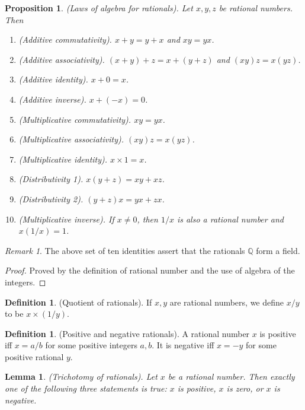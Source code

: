\documentclass[12pt]{article}
\newtheorem{lemma}[theorem]{Lemma}
\newtheorem{proposition}[theorem]{Proposition}
\theoremstyle{definition}
\newtheorem{definition}[theorem]{Definition}
\theoremstyle{remark}
\newtheorem*{remark}{Remark}
\begin{document}
\begin{proposition}
    (Laws of algebra for rationals). Let $x, y, z$ be rational numbers. Then
    \begin{enumerate}
        \item (Additive commutativity). $x + y = y + x$ and $xy = yx$.
        \item (Additive associativity). $(x + y) + z = x + (y + z)$ and $(xy)z = x(yz)$.
        \item (Additive identity). $x + 0 = x$.
        \item (Additive inverse). $x + (-x) = 0$.
        \item (Multiplicative commutativity). $xy = yx$.
        \item (Multiplicative associativity). $(xy)z = x(yz)$.
        \item (Multiplicative identity). $x \times 1 = x$.
        \item (Distributivity 1). $x(y + z) = xy + xz$.
        \item (Distributivity 2). $(y + z)x = yx + zx$.
        \item (Multiplicative inverse). If $x \neq 0$, then $1/x$ is also a rational number and $x(1/x) = 1$.
    \end{enumerate}
\end{proposition}

\begin{remark}
    The above set of ten identities assert that the rationals $\mathbb{Q}$ form a field.
\end{remark}

\begin{proof}
    Proved by the definition of rational number and the use of algebra of the integers.
\end{proof}

\begin{definition}
    (Quotient of rationals). If $x, y$ are rational numbers, we define $x/y$ to be $x \times (1/y)$.
\end{definition}

\begin{definition}
    (Positive and negative rationals). A rational number $x$ is positive iff $x = a/b$ for some positive integers $a, b$. It is negative iff $x = -y$ for some positive rational $y$.
\end{definition}

\begin{lemma}
    (Trichotomy of rationals). Let $x$ be a rational number. Then exactly one of the following three statements is true: $x$ is positive, $x$ is zero, or $x$ is negative.
\end{lemma}
\end{document}
